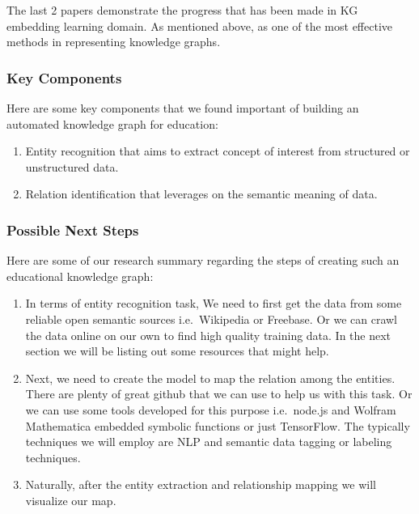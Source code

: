 \documentclass{acm_proc_article-sp}
\begin{document}
The last 2 papers demonstrate the progress that has been made in KG
embedding learning domain. As mentioned above, as one of the most
effective methods in representing knowledge graphs.

\subsubsection{Key Components}\label{key-components}

Here are some key components that we found important of building an
automated knowledge graph for education:

\begin{enumerate}
\def\labelenumi{\arabic{enumi}.}
\item
  Entity recognition that aims to extract concept of interest from
  structured or unstructured data.
\item
  Relation identification that leverages on the semantic meaning of
  data.
\end{enumerate}

\subsubsection{Possible Next Steps}\label{possible-next-steps}

Here are some of our research summary regarding the steps of creating
such an educational knowledge graph:

\begin{enumerate}
\def\labelenumi{\arabic{enumi}.}
\item
  In terms of entity recognition task, We need to first get the data
  from some reliable open semantic sources i.e.~Wikipedia or Freebase.
  Or we can crawl the data online on our own to find high quality
  training data. In the next section we will be listing out some
  resources that might help.
\item
  Next, we need to create the model to map the relation among the
  entities. There are plenty of great github that we can use to help us
  with this task. Or we can use some tools developed for this purpose
  i.e.~node.js and Wolfram Mathematica embedded symbolic functions or
  just TensorFlow. The typically techniques we will employ are NLP and
  semantic data tagging or labeling techniques.
\item
  Naturally, after the entity extraction and relationship mapping we
  will visualize our map.
\end{enumerate}
\end{document}
